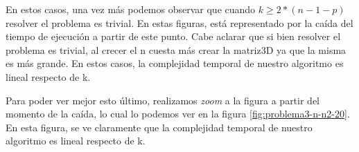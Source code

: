 En estos casos, una vez más podemos observar que cuando $k \geq 2*(n-1-p)$ resolver el problema es trivial. En estas figuras, está representado por la caída del tiempo de ejecución a partir de este punto. Cabe aclarar que si bien resolver el problema es trivial, al crecer el n cuesta más crear la matriz3D ya que la misma es más grande. En estos casos, la complejidad temporal de nuestro algoritmo es lineal respecto de k.

Para poder ver mejor esto último, realizamos \emph{zoom} a la figura a partir del momento de la caída, lo cual lo podemos ver en la figura \ref{fig:problema3-n-n2-20}. En esta figura, se ve claramente que la complejidad temporal de nuestro algoritmo es lineal respecto de k.

